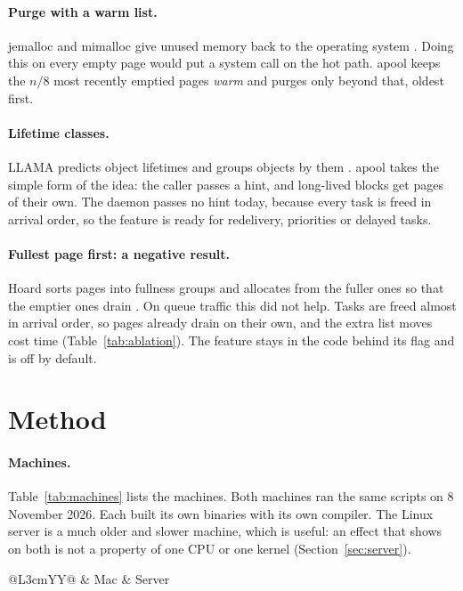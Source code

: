 \documentclass[10.5pt,a4paper]{article}
\newcommand{\file}[1]{\texttt{\small #1}}
\begin{document}
\paragraph{Purge with a warm list.} jemalloc and mimalloc give unused memory back to the operating system \citep{evans2006jemalloc,leijen2019mimalloc}. Doing this on every empty page would put a system call on the hot path. apool keeps the $n/8$ most recently emptied pages \emph{warm} and purges only beyond that, oldest first.

\paragraph{Lifetime classes.} LLAMA predicts object lifetimes and groups objects by them \citep{maas2020llama}. apool takes the simple form of the idea: the caller passes a hint, and long-lived blocks get pages of their own. The daemon passes no hint today, because every task is freed in arrival order, so the feature is ready for redelivery, priorities or delayed tasks.

\paragraph{Fullest page first: a negative result.} Hoard sorts pages into fullness groups and allocates from the fuller ones so that the emptier ones drain \citep{berger2000hoard}. On queue traffic this did not help. Tasks are freed almost in arrival order, so pages already drain on their own, and the extra list moves cost time (Table~\ref{tab:ablation}). The feature stays in the code behind its flag and is off by default.

\section{Method}\label{sec:method}

\paragraph{Machines.} Table~\ref{tab:machines} lists the machines. Both machines ran the same scripts on 8 November 2026. Each built its own binaries with its own compiler. The Linux server is a much older and slower machine, which is useful: an effect that shows on both is not a property of one CPU or one kernel (Section~\ref{sec:server}).

\begin{table}[ht]
\centering\footnotesize
\begin{tabularx}{\textwidth}{@{}L{3cm}YY@{}}
\toprule
& Mac & Server \\
\midrule
{}
\bottomrule
\end{tabularx}
\caption{Machines (from \file{results/*/machine.txt}).}
\label{tab:machines}
\end{table}
\end{document}
